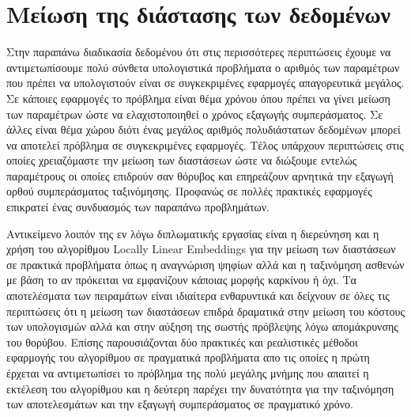 \section{Μείωση της διάστασης των δεδομένων}
\par
Στην παραπάνω διαδικασία δεδομένου ότι στις περισσότερες περιπτώσεις έχουμε να αντιμετωπίσουμε πολύ σύνθετα υπολογιστικά προβλήματα ο αριθμός των παραμέτρων που πρέπει να υπολογιστούν είναι σε συγκεκριμένες εφαρμογές απαγορευτικά μεγάλος. Σε κάποιες εφαρμογές το πρόβλημα είναι θέμα χρόνου όπου πρέπει να γίνει μείωση των παραμέτρων ώστε να ελαχιστοποιηθεί ο χρόνος εξαγωγής συμπεράσματος. Σε άλλες είναι θέμα χώρου διότι ένας μεγάλος αριθμός πολυδιάστατων δεδομένων μπορεί να αποτελεί πρόβλημα σε συγκεκριμένες εφαρμογές. Τέλος υπάρχουν περιπτώσεις στις οποίες χρειαζόμαστε την μείωση των διαστάσεων ώστε να διώξουμε εντελώς παραμέτρους οι οποίες επιδρούν σαν θόρυβος και επηρεάζουν αρνητικά την εξαγωγή ορθού συμπεράσματος ταξινόμησης. Προφανώς σε πολλές πρακτικές εφαρμογές επικρατεί ένας συνδυασμός των παραπάνω προβλημάτων.
\par
Αντικείμενο λοιπόν της εν λόγω διπλωματικής εργασίας είναι η διερεύνηση και η χρήση του αλγορίθμου \textlatin{Locally Linear Embeddings} για την μείωση των διαστάσεων σε πρακτικά προβλήματα όπως η αναγνώριση ψηφίων αλλά και η ταξινόμηση ασθενών με βάση το αν πρόκειται να εμφανίζουν κάποιας μορφής καρκίνου ή όχι. Τα αποτελέσματα των πειραμάτων είναι ιδιαίτερα ενθαρυντικά και δείχνουν σε όλες τις περιπτώσεις ότι η μείωση των διαστάσεων επιδρά δραματικά στην μείωση του κόστους των υπολογισμών αλλά και στην αύξηση της σωστής πρόβλεψης λόγω απομάκρυνσης του θορύβου. Επίσης παρουσιάζονται δύο πρακτικές και ρεαλιστικές μέθοδοι εφαρμογής του αλγορίθμου σε πραγματικά προβλήματα απο τις οποίες η πρώτη έρχεται να αντιμετωπίσει το πρόβλημα της πολύ μεγάλης μνήμης που απαιτεί η εκτέλεση του αλγορίθμου και η δεύτερη παρέχει την δυνατότητα για την ταξινόμηση των αποτελεσμάτων και την εξαγωγή συμπεράσματος σε πραγματικό χρόνο. 


